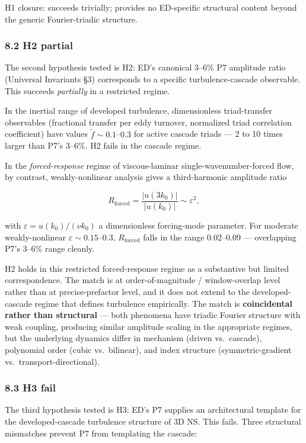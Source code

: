 \documentclass[
  11pt,a4paper]{article}
\begin{document}
H1 closure: succeeds trivially; provides no ED-specific structural
content beyond the generic Fourier-triadic structure.

\subsubsection{8.2 H2 partial}\label{h2-partial}

The second hypothesis tested is H2: ED's canonical 3--6\% P7 amplitude
ratio (Universal Invariants §3) corresponds to a specific
turbulence-cascade observable. This succeeds \emph{partially} in a
restricted regime.

In the inertial range of developed turbulence, dimensionless
triad-transfer observables (fractional transfer per eddy turnover,
normalized triad correlation coefficient) have values
\(\tilde f \sim 0.1\)--\(0.3\) for active cascade triads --- 2 to 10
times larger than P7's 3--6\%. H2 fails in the cascade regime.

In the \emph{forced-response} regime of viscous-laminar
single-wavenumber-forced flow, by contrast, weakly-nonlinear analysis
gives a third-harmonic amplitude ratio

\[R_\mathrm{forced} = \frac{|u(3k_0)|}{|u(k_0)|} \sim \varepsilon^2,\]

with \(\varepsilon = u(k_0)/(\nu k_0)\) a dimensionless forcing-mode
parameter. For moderate weakly-nonlinear
\(\varepsilon \sim 0.15\)--\(0.3\), \(R_\mathrm{forced}\) falls in the
range 0.02--0.09 --- overlapping P7's 3--6\% range cleanly.

H2 holds in this restricted forced-response regime as a substantive but
limited correspondence. The match is at order-of-magnitude /
window-overlap level rather than at precise-prefactor level, and it does
not extend to the developed-cascade regime that defines turbulence
empirically. The match is \textbf{coincidental rather than structural}
--- both phenomena have triadic Fourier structure with weak coupling,
producing similar amplitude scaling in the appropriate regimes, but the
underlying dynamics differ in mechanism (driven vs.~cascade), polynomial
order (cubic vs.~bilinear), and index structure (symmetric-gradient
vs.~transport-directional).

\subsubsection{8.3 H3 fail}\label{h3-fail}

The third hypothesis tested is H3: ED's P7 supplies an architectural
template for the developed-cascade turbulence structure of 3D NS. This
fails. Three structural mismatches prevent P7 from templating the
cascade:
\end{document}
